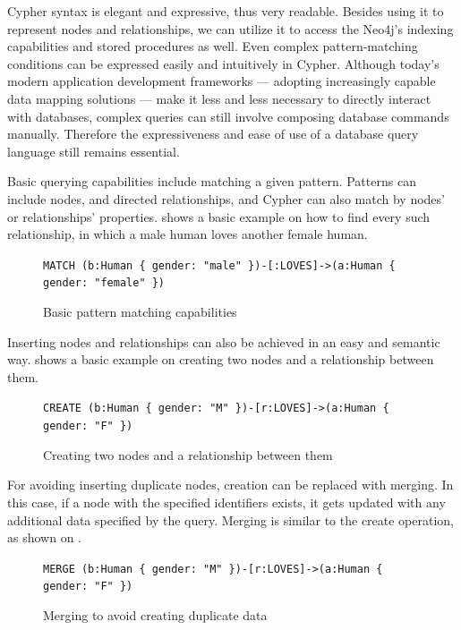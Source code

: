 Cypher syntax is elegant and expressive, thus very readable. Besides using it to represent nodes and relationships, we can utilize it to access the Neo4j's indexing capabilities and stored procedures as well. Even complex pattern-matching conditions can be expressed easily and intuitively in Cypher. Although today's modern application development frameworks — adopting increasingly capable data mapping solutions — make it less and less necessary to directly interact with databases, complex queries can still involve composing database commands manually. Therefore the expressiveness and ease of use of a database query language still remains essential.

Basic querying capabilities include matching a given pattern. Patterns can include nodes, and directed relationships, and Cypher can also match by nodes' or relationships' properties.  shows a basic example on how to find every such relationship, in which a male human loves another female human.

\begin{figure}[!htb]
    \centering
    \lstinline|MATCH (b:Human { gender: "male" })-[:LOVES]->(a:Human { gender: "female" })|
    \caption{Basic pattern matching capabilities}
    \label{fig:cypher-matching}
\end{figure}

Inserting nodes and relationships can also be achieved in an easy and semantic way.  shows a basic example on creating two nodes and a relationship between them.

\begin{figure}[!htb]
    \centering
    \lstinline|CREATE (b:Human { gender: "M" })-[r:LOVES]->(a:Human { gender: "F" })|
    \caption{Creating two nodes and a relationship between them}
    \label{fig:cypher-create}
\end{figure}

For avoiding inserting duplicate nodes, creation can be replaced with merging. In this case, if a node with the specified identifiers exists, it gets updated with any additional data specified by the query. Merging is similar to the create operation, as shown on .

\begin{figure}[!htb]
    \centering
    \lstinline|MERGE (b:Human { gender: "M" })-[r:LOVES]->(a:Human { gender: "F" })|
    \caption{Merging to avoid creating duplicate data}
    \label{fig:cypher-merge}
\end{figure}

